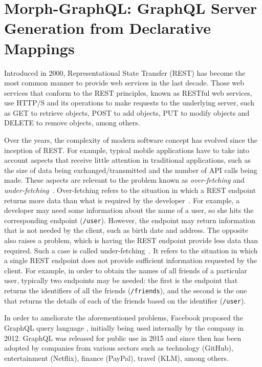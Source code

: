 \section{Morph-GraphQL: GraphQL Server Generation from Declarative Mappings}
Introduced in 2000, Representational State Transfer (REST) has become the most common manner to provide web services in the last decade. Those web services that conform to the REST principles, known as RESTful web services, use HTTP/S and its operations to make requests to the underlying server, such as GET to retrieve objects, POST to add objects, PUT to modify objects and DELETE to remove objects, among others.

Over the years, the complexity of modern software concept has evolved since the inception of REST. For example, typical mobile applications have to take into account aspects that receive little attention in traditional applications, such as the size of data being exchanged/transmitted and the number of API calls being made. These aspects are relevant to the problem known as \textit{over-fetching} and \textit{under-fetching}~\citep{bryant2017graphql,vogel2017experiences,mukhiya2019graphql}. Over-fetching refers to the situation in which a REST endpoint returns more data than what is required by the developer~\citep{bryant2017graphql,vogel2017experiences,mukhiya2019graphql}. For example, a developer may need some information about the name of a user, so she hits the corresponding endpoint (\texttt{/user}). However, the endpoint may return information that is not needed by the client, such as birth date and address. The opposite also raises a problem, which is having the REST endpoint provide less data than required. Such a case is called under-fetching~\citep{bryant2017graphql,vogel2017experiences,mukhiya2019graphql}. It refers to the situation in which a single REST endpoint does not provide sufficient information requested by the client. For example, in order to obtain the names of all friends of a particular user, typically two endpoints may be needed: the first is the endpoint that returns the identifiers of all the friends (\texttt{/friends}), and the second is the one that returns the details of each of the friends based on the identifier (\texttt{/user}).

In order to ameliorate the aforementioned problems, Facebook proposed the GraphQL query language \citep{graphql}, initially being used internally by the company in 2012. GraphQL was released for public use in 2015 and since then has been adopted by companies from various sectors such as technology (GitHub), entertainment (Netflix), finance (PayPal), travel (KLM), among others. 

